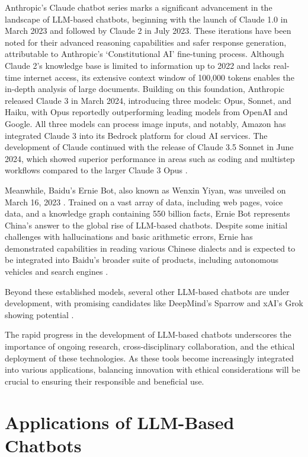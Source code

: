 Anthropic’s Claude chatbot series marks a significant advancement in the landscape of LLM-based chatbots, beginning with the launch of Claude 1.0 in March 2023 and followed by Claude 2 in July 2023. These iterations have been noted for their advanced reasoning capabilities and safer response generation, attributable to Anthropic’s ‘Constitutional AI’ fine-tuning process. Although Claude 2’s knowledge base is limited to information up to 2022 and lacks real-time internet access, its extensive context window of 100,000 tokens enables the in-depth analysis of large documents. Building on this foundation, Anthropic released Claude 3 in March 2024, introducing three models: Opus, Sonnet, and Haiku, with Opus reportedly outperforming leading models from OpenAI and Google. All three models can process image inputs, and notably, Amazon has integrated Claude 3 into its Bedrock platform for cloud AI services. The development of Claude continued with the release of Claude 3.5 Sonnet in June 2024, which showed superior performance in areas such as coding and multistep workflows compared to the larger Claude 3 Opus \cite{wikipedia2024anthropic}. 

Meanwhile, Baidu's Ernie Bot, also known as Wenxin Yiyan, was unveiled on March 16, 2023 \cite{motlagh2023impact}. Trained on a vast array of data, including web pages, voice data, and a knowledge graph containing 550 billion facts, Ernie Bot represents China's answer to the global rise of LLM-based chatbots. Despite some initial challenges with hallucinations and basic arithmetic errors, Ernie has demonstrated capabilities in reading various Chinese dialects and is expected to be integrated into Baidu's broader suite of products, including autonomous vehicles and search engines \cite{yang2023baidu}.

Beyond these established models, several other LLM-based chatbots are under development, with promising candidates like DeepMind's Sparrow and xAI's Grok showing potential \cite{rodriguez2023sparrow, wikipedia2024grok}.

The rapid progress in the development of LLM-based chatbots underscores the importance of ongoing research, cross-disciplinary collaboration, and the ethical deployment of these technologies. As these tools become increasingly integrated into various applications, balancing innovation with ethical considerations will be crucial to ensuring their responsible and beneficial use.

\section{Applications of LLM-Based Chatbots}

